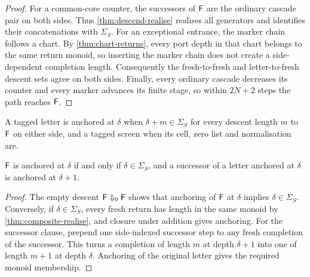 \begin{proof}
\leanok
{}
For a common-core counter, the successors of $\mathsf{F}$ are the ordinary cascade pair on both sides.
Thus \cref{thm:descend-realise} realises all generators and identifies their concatenations with
$\Sigma_S$. For an exceptional entrance, the marker chain follows a chart. By
\cref{thm:chart-returns}, every port depth in that chart belongs to the same return monoid, so
inserting the marker chain does not create a side-dependent completion length. Consequently the
fresh-to-fresh and letter-to-fresh descent sets agree on both sides. Finally, every ordinary
cascade decreases its counter and every marker advances its finite stage, so within $2N+2$ steps
the path reaches $\mathsf{F}$.
\end{proof}

\begin{definition}
\label{def:composite-anchored}
\leanok
{}
A tagged letter is anchored at $\delta$ when $\delta+m\in\Sigma_S$ for every descent length $m$
to $\mathsf{F}$ on either side, and a tagged screen when its cell, zero list and normalisation are.
\end{definition}

\begin{lemma}
\label{thm:composite-anchor}
\leanok
{}
$\mathsf{F}$ is anchored at $\delta$ if and only if $\delta\in\Sigma_S$, and a successor of a letter
anchored at $\delta$ is anchored at $\delta+1$.
\end{lemma}

\begin{proof}
\leanok
{}
The empty descent $\mathsf{F}\Downarrow_0\mathsf{F}$ shows that anchoring of $\mathsf{F}$ at $\delta$ implies
$\delta\in\Sigma_S$. Conversely, if $\delta\in\Sigma_S$, every fresh return has length in the
same monoid by \cref{thm:composite-realise}, and closure under addition gives anchoring. For the
successor clause, prepend one side-indexed successor step to any fresh completion of the successor.
This turns a completion of length $m$ at depth $\delta+1$ into one of length $m+1$ at depth
$\delta$. Anchoring of the original letter gives the required monoid membership.
\end{proof}


